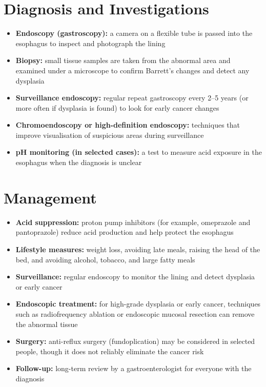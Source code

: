 \section*{Diagnosis and Investigations}
\begin{itemize}
    \item \textbf{Endoscopy (gastroscopy):} a camera on a flexible tube is passed into the esophagus to inspect and photograph the lining
    \item \textbf{Biopsy:} small tissue samples are taken from the abnormal area and examined under a microscope to confirm Barrett's changes and detect any dysplasia
    \item \textbf{Surveillance endoscopy:} regular repeat gastroscopy every 2--5 years (or more often if dysplasia is found) to look for early cancer changes
    \item \textbf{Chromoendoscopy or high-definition endoscopy:} techniques that improve visualisation of suspicious areas during surveillance
    \item \textbf{pH monitoring (in selected cases):} a test to measure acid exposure in the esophagus when the diagnosis is unclear
\end{itemize}

\section*{Management}
\begin{itemize}
    \item \textbf{Acid suppression:} proton pump inhibitors (for example, omeprazole and pantoprazole) reduce acid production and help protect the esophagus
    \item \textbf{Lifestyle measures:} weight loss, avoiding late meals, raising the head of the bed, and avoiding alcohol, tobacco, and large fatty meals
    \item \textbf{Surveillance:} regular endoscopy to monitor the lining and detect dysplasia or early cancer
    \item \textbf{Endoscopic treatment:} for high-grade dysplasia or early cancer, techniques such as radiofrequency ablation or endoscopic mucosal resection can remove the abnormal tissue
    \item \textbf{Surgery:} anti-reflux surgery (fundoplication) may be considered in selected people, though it does not reliably eliminate the cancer risk
    \item \textbf{Follow-up:} long-term review by a gastroenterologist for everyone with the diagnosis
\end{itemize}

